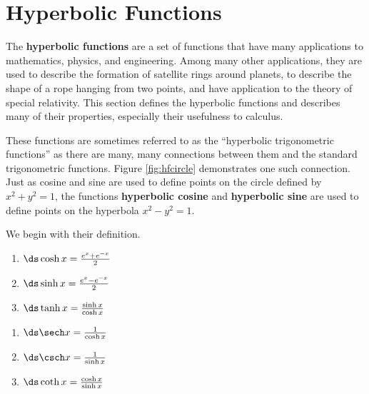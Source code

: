 \section{Hyperbolic Functions}\label{sec:hyperbolic}

The \textbf{hyperbolic functions} are a set of functions that have many applications to mathematics, physics, and engineering. Among many other applications, they are used to describe the formation of satellite rings around planets, to describe the shape of a rope hanging from two points, and have application to the theory of special relativity. This section defines the hyperbolic functions and describes many of their properties, especially their usefulness to calculus.

These functions are sometimes referred to as the ``hyperbolic trigonometric functions'' as there are many, many connections between them and the standard trigonometric functions. Figure \ref{fig:hfcircle} demonstrates one such connection. Just as cosine and sine are used to define points on the circle defined by $x^2+y^2=1$, the functions \textbf{hyperbolic cosine} and \textbf{hyperbolic sine} are used to define points on the hyperbola $x^2-y^2=1$.


We begin with their definition.

{\noindent%
\begin{minipage}{.5\specialboxlength}
\begin{enumerate}
\item		$\ds \cosh x = \frac{e^x+e^{-x}}2$
\item		$\ds \sinh x = \frac{e^x-e^{-x}}2$
\item		$\ds \tanh x = \frac{\sinh x}{\cosh x}$
\end{enumerate}
\end{minipage}
\begin{minipage}{.5\specialboxlength}
\begin{enumerate}\addtocounter{enumi}{3}
\item		$\ds \sech x = \frac{1}{\cosh x}$
\item		$\ds \csch x = \frac{1}{\sinh x}$
\item		$\ds \coth x = \frac{\cosh x}{\sinh x}$
\end{enumerate}
\end{minipage}
}\\

